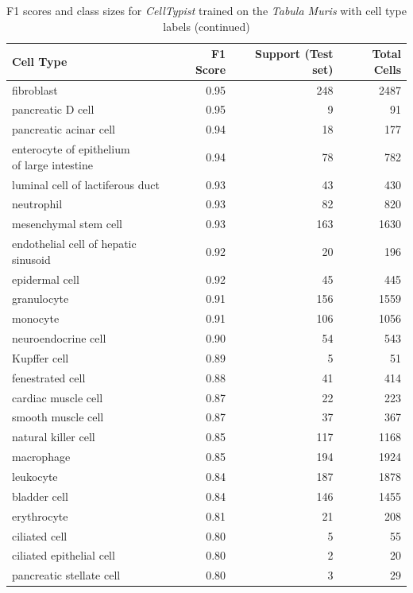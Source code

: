 \begin{table}[pht!]
\small
\caption[F1 scores and class sizes for \textit{CellTypist} trained on the \textit{Tabula Muris} with cell type labels (continued)]{F1 scores and class sizes for \textit{CellTypist} trained on the \textit{Tabula Muris} with cell type labels (continued)}
\centering
\label{table:tab_tmmodelcells2}

\begin{tabular}{lrrr}
  \toprule
Cell Type & F1 Score & Support (Test set) & Total Cells \\ 
  \midrule
fibroblast & 0.95 & 248 & 2487 \\ 
  pancreatic D cell & 0.95 &   9 &  91 \\ 
  pancreatic acinar cell & 0.94 &  18 & 177 \\ 
  \specialcell[t]{enterocyte of epithelium\\of large intestine} & 0.94 &  78 & 782 \\ 
  luminal cell of lactiferous duct & 0.93 &  43 & 430 \\ 
  neutrophil & 0.93 &  82 & 820 \\ 
  mesenchymal stem cell & 0.93 & 163 & 1630 \\ 
  endothelial cell of hepatic sinusoid & 0.92 &  20 & 196 \\ 
  epidermal cell & 0.92 &  45 & 445 \\ 
  granulocyte & 0.91 & 156 & 1559 \\ 
  monocyte & 0.91 & 106 & 1056 \\ 
  neuroendocrine cell & 0.90 &  54 & 543 \\ 
  Kupffer cell & 0.89 &   5 &  51 \\ 
  fenestrated cell & 0.88 &  41 & 414 \\ 
  cardiac muscle cell & 0.87 &  22 & 223 \\ 
  smooth muscle cell & 0.87 &  37 & 367 \\ 
  natural killer cell & 0.85 & 117 & 1168 \\ 
  macrophage & 0.85 & 194 & 1924 \\ 
  leukocyte & 0.84 & 187 & 1878 \\ 
  bladder cell & 0.84 & 146 & 1455 \\ 
  erythrocyte & 0.81 &  21 & 208 \\ 
  ciliated cell & 0.80 &   5 &  55 \\ 
  ciliated epithelial cell & 0.80 &   2 &  20 \\ 
  pancreatic stellate cell & 0.80 &   3 &  29 \\ 

\end{tabular}
\end{table}
